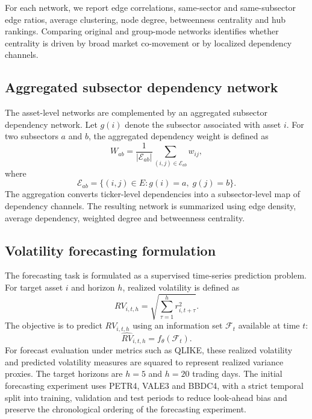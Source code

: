 For each network, we report edge correlations, same-sector and same-subsector edge ratios, average clustering, node degree, betweenness centrality and hub rankings. Comparing original and group-mode networks identifies whether centrality is driven by broad market co-movement or by localized dependency channels.

\subsection{Aggregated subsector dependency network}
\label{subsec:subsector_network_method}

The asset-level networks are complemented by an aggregated subsector dependency network. Let $g(i)$ denote the subsector associated with asset $i$. For two subsectors $a$ and $b$, the aggregated dependency weight is defined as
\begin{equation}
W_{ab}
=
\frac{1}{|\mathcal{E}_{ab}|}
\sum_{(i,j)\in \mathcal{E}_{ab}}
w_{ij},
\end{equation}
where
\begin{equation}
\mathcal{E}_{ab}
=
\{(i,j)\in E : g(i)=a,\; g(j)=b\}.
\end{equation}
The aggregation converts ticker-level dependencies into a subsector-level map of dependency channels. The resulting network is summarized using edge density, average dependency, weighted degree and betweenness centrality.

\subsection{Volatility forecasting formulation}
\label{subsec:forecasting_method}

The forecasting task is formulated as a supervised time-series prediction problem. For target asset $i$ and horizon $h$, realized volatility is defined as
\begin{equation}
RV_{i,t,h}
=
\sqrt{
\sum_{\tau=1}^{h}
r_{i,t+\tau}^{2}
}.
\end{equation}
The objective is to predict $RV_{i,t,h}$ using an information set $\mathcal{F}_t$ available at time $t$:
\begin{equation}
\widehat{RV}_{i,t,h}
=
f_{\theta}(\mathcal{F}_t).
\end{equation}
For forecast evaluation under metrics such as QLIKE, these realized volatility and predicted volatility measures are squared to represent realized variance proxies. The target horizons are $h=5$ and $h=20$ trading days. The initial forecasting experiment uses PETR4, VALE3 and BBDC4, with a strict temporal split into training, validation and test periods to reduce look-ahead bias and preserve the chronological ordering of the forecasting experiment.

